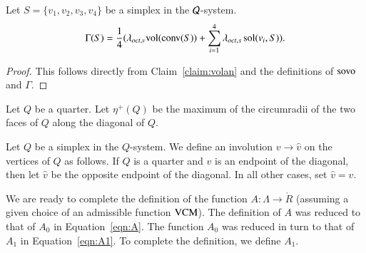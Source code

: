 \begin{lemma}\label{lemma:gammavol}
Let $S=\{v_1,v_2,v_3,v_4\}$ be a simplex in the ${\mathcal Q}$-system.
    $$\Gamma(S) = \frac{1}{4}(\lambda_{oct,v}{\operatorname{vol}}({\operatorname{conv}}(S)) +\sum_{i=1}^4
    \lambda_{oct,s}\operatorname{sol}(v_i,S)).
    $$
\end{lemma}

\begin{proof} This follows directly from Claim~\ref{claim:volan}
and the definitions of ${\operatorname{sovo}}$ and $\Gamma$.
\end{proof}

\begin{definition}[$\eta^+(Q)$]
Let $Q$ be a quarter.   Let $\eta^+(Q)$ be the maximum of the
circumradii of the two faces of $Q$ along the diagonal of $Q$.
\end{definition}

Let $Q$ be a simplex in the $Q$-system.  We define an involution
$v\to \hat v$ on the vertices of $Q$ as follows.  If $Q$ is a
quarter and $v$ is an endpoint of the diagonal, then let $\hat v$
be the opposite endpoint of the diagonal.  In all other cases, set
$\hat v = v$.

We are ready to complete the definition of the function
$A:\Lambda\to\ring{R}$ (assuming a given choice of an admissible
function ${\operatorname{VCM}}$). The definition of $A$ was reduced to that of
$A_0$ in Equation~\ref{eqn:A}.  The function $A_0$ was reduced in
turn to that of $A_1$ in Equation~\ref{eqn:A1}. To complete the
definition, we define $A_1$.

